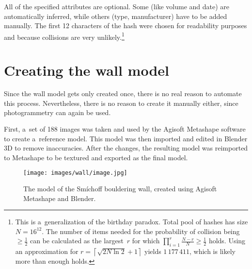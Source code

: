 All of the specified attributes are optional.
Some (like volume and date) are automatically inferred, while others (type, manufacturer) have to be added manually.
The first 12 characters of the hash were chosen for readability purposes and because collisions are very unlikely.\footnote{This is a~generalization of the birthday paradox. Total pool of hashes has size $N = 16^{12}$. The number of items needed for the probability of collision being $\ge \frac{1}{2}$ can be calculated as the largest~$r$ for which $\prod_{i = 1}^{r} \frac{N - r}{N} \ge \frac{1}{2}$ holds. Using an approximation for $r = \left\lceil \sqrt{2N \ln 2} + 1 \right\rceil$ \cite{brink2012probably} yields $1\,177\,411$, which is likely more than enough holds.}

\section{Creating the wall model}
Since the wall model gets only created once, there is no real reason to automate this process.
Nevertheless, there is no reason to create it manually either, since photogrammetry can again be used.

First, a~set of 188 images was taken and used by the Agisoft Metashape software to create a~reference model.
This model was then imported and edited in Blender 3D to remove inaccuracies.
After the changes, the resulting model was reimported to Metashape to be textured and exported as the final model.

\begin{figure}[h]
	\centering
	\texttt{[image: images/wall/image.jpg]}
	\caption{The model of the Smíchoff bouldering wall, created using Agisoft Metashape and Blender.}
	\label{fig:model}
\end{figure}
